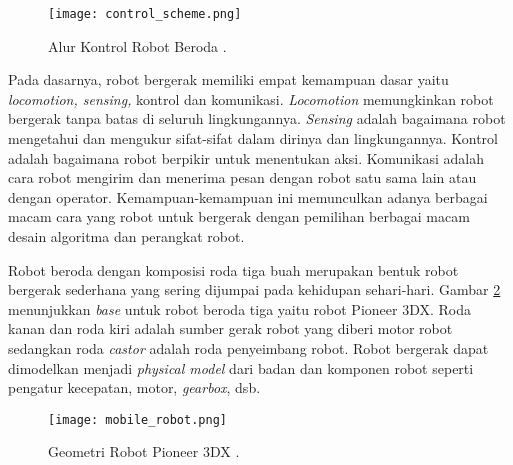 \begin{figure}[H]
    \centering
    \texttt{[image: control\_scheme.png]}
    \caption{Alur Kontrol Robot Beroda \cite{b3}.}
    \label{fig:Ch02_control_scheme}
\end{figure}

Pada dasarnya, robot bergerak memiliki empat kemampuan dasar yaitu \textit{locomotion, sensing,} kontrol dan komunikasi\cite{b3}. 
\textit{Locomotion} memungkinkan robot bergerak tanpa batas 
di seluruh lingkungannya. 
\textit{Sensing} adalah bagaimana robot mengetahui dan mengukur sifat-sifat dalam dirinya dan lingkungannya.
Kontrol adalah bagaimana robot berpikir untuk menentukan aksi. Komunikasi adalah cara robot mengirim dan menerima pesan dengan robot satu sama lain atau dengan operator. Kemampuan-kemampuan ini memunculkan adanya berbagai macam cara yang robot untuk bergerak dengan pemilihan berbagai macam desain algoritma dan perangkat robot. 

Robot beroda dengan komposisi roda tiga buah merupakan bentuk robot bergerak sederhana yang sering dijumpai pada kehidupan sehari-hari. Gambar \ref*{fig:Ch02_mobile_robot} menunjukkan \textit{base} untuk robot beroda tiga yaitu robot Pioneer 3DX. Roda kanan dan roda kiri adalah sumber gerak robot yang diberi motor robot sedangkan roda \textit{castor} adalah roda penyeimbang robot. Robot bergerak dapat dimodelkan menjadi \textit{physical model} dari badan dan komponen robot seperti pengatur kecepatan, motor, \textit{gearbox}, dsb. 

\begin{figure}[H]
    \centering
    \texttt{[image: mobile\_robot.png]}
    \caption{Geometri Robot Pioneer 3DX \cite{b4}.}
    \label{fig:Ch02_mobile_robot}
\end{figure}

